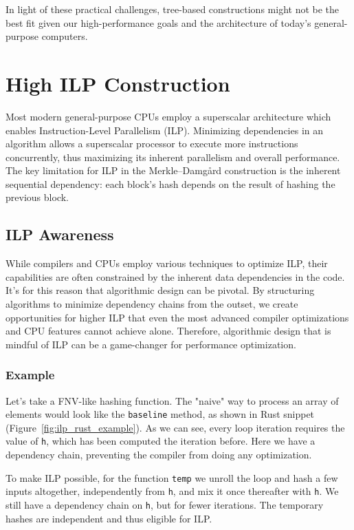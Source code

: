 \documentclass[10pt]{article}
\begin{document}
In light of these practical challenges, tree-based constructions might not be the best fit given our high-performance goals and the architecture of today's general-purpose computers.

\clearpage
\section{High ILP Construction} \label{highilp}

Most modern general-purpose CPUs employ a superscalar architecture which enables Instruction-Level Parallelism (ILP). 
Minimizing dependencies in an algorithm allows a superscalar processor to execute more instructions concurrently, thus maximizing its inherent parallelism and overall performance.
The key limitation for ILP in the Merkle–Damgård construction is the inherent sequential dependency: each block's hash depends on the result of hashing the previous block.

\subsection{ILP Awareness}

While compilers and CPUs employ various techniques to optimize ILP, their capabilities are often constrained by the inherent data dependencies in the code. It's for this reason that algorithmic design can be pivotal. By structuring algorithms to minimize dependency chains from the outset, we create opportunities for higher ILP that even the most advanced compiler optimizations and CPU features cannot achieve alone. Therefore, algorithmic design that is mindful of ILP can be a game-changer for performance optimization.

\subsubsection{Example}
Let's take a FNV-like hashing function. The "naive" way to process an array of elements would look like the \texttt{baseline} method, as shown in Rust snippet (Figure~\ref{fig:ilp_rust_example}). As we can see, every loop iteration requires the value of \texttt{h}, which has been computed the iteration before. Here we have a dependency chain, preventing the compiler from doing any optimization.

To make ILP possible, for the function \texttt{temp} we unroll the loop and hash a few inputs altogether, independently from \texttt{h}, and mix it once thereafter with \texttt{h}. We still have a dependency chain on \texttt{h}, but for fewer iterations.
The temporary hashes are independent and thus eligible for ILP.
\end{document}
